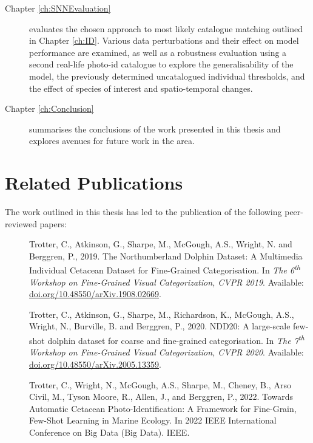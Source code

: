 \begin{description}
	\item[Chapter \ref{ch:SNNEvaluation}] evaluates the chosen approach to most likely catalogue matching outlined in Chapter \ref{ch:ID}. Various data perturbations and their effect on model performance are examined, as well as a robustness evaluation using a second real-life photo-id catalogue to explore the generalisability of the model, the previously determined uncatalogued individual thresholds, and the effect of species of interest and spatio-temporal changes.
	
	\item[Chapter \ref{ch:Conclusion}] summarises the conclusions of the work presented in this thesis and explores avenues for future work in the area.  
	 
\end{description}

\section{Related Publications}\label{ch:intro,relatedPublications}

The work outlined in this thesis has led to the publication of the following peer-reviewed papers:


\begin{description}
	
	\item[\cite{trotter_northumberland_2019}] Trotter, C., Atkinson, G., Sharpe, M., McGough, A.S., Wright, N. and Berggren, P., 2019. The Northumberland Dolphin Dataset: A Multimedia Individual Cetacean Dataset for Fine-Grained Categorisation. In \textit{The 6\textsuperscript{th} Workshop on Fine-Grained Visual Categorization, CVPR 2019}. Available: \href{https://doi.org/10.48550/arXiv.1908.02669}{doi.org/10.48550/arXiv.1908.02669}. %
	
	\newpage
	
	\item[\cite{trotter_ndd20_2020}] Trotter, C., Atkinson, G., Sharpe, M., Richardson, K., McGough, A.S., Wright, N., Burville, B. and Berggren, P., 2020. NDD20: A large-scale few-shot dolphin dataset for coarse and fine-grained categorisation. In \textit{The 7\textsuperscript{th} Workshop on Fine-Grained Visual Categorization, CVPR 2020}. Available: \href{https://doi.org/10.48550/arXiv.2005.13359}{doi.org/10.48550/arXiv.2005.13359}. %
	
	\item [\cite{trotter_towards_2022}] Trotter, C., Wright, N., McGough, A.S., Sharpe, M., Cheney, B., Arso Civil, M., Tyson Moore, R., Allen, J., and Berggren, P., 2022. Towards Automatic Cetacean Photo-Identification: A Framework for Fine-Grain, Few-Shot Learning in Marine Ecology. In 2022 IEEE International Conference on Big Data (Big Data). IEEE. %
\end{description}

